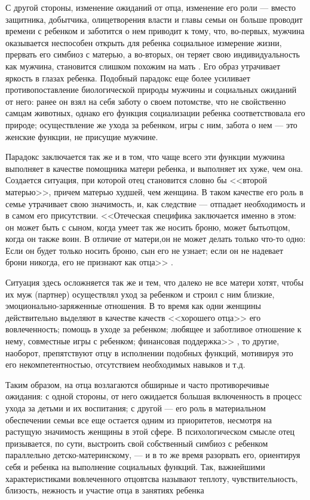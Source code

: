 \documentclass{../../common/thesisbyxetex}
\begin{document}
С другой стороны, изменение ожиданий от отца, изменение его роли --- вместо защитника, добытчика,
олицетворения власти и главы семьи он больше проводит времени с ребенком и заботится о нем
приводит к тому, что, во-первых, мужчина оказывается неспособен открыть для ребенка социальное
измерение жизни, прервать его симбиоз с матерью, а во-вторых, он теряет свою индивидуальность как
мужчина, становится слишком похожим на мать \cite[285]{zo}. Его образ утрачивает
яркость в глазах ребенка. Подобный парадокс еще более усиливает противопоставление биологической
природы мужчины и социальных ожиданий от него: ранее он взял на себя заботу о своем потомстве, что
не свойственно самцам животных, однако его функция социализации ребенка соответствовала его
природе; осуществление же ухода за ребенком, игры  с ним, забота о нем --- это женские функции, не
присущие мужчине.

Парадокс заключается так же и в том, что чаще всего эти функции мужчина выполняет в качестве
помощника матери ребенка, и выполняет их хуже, чем она. Создается ситуация, при
которой отец становится словно бы <<второй матерью>>, причем матерью худшей, чем женщина. В таком
качестве его роль в семье утрачивает свою значимость, и, как следствие --- отпадает
необходимость и в самом его присутствии. <<Отеческая специфика заключается именно в этом: он может
быть с сыном, когда умеет так же носить
броню, может бытьотцом, когда он также воин. В отличие от матери,он не может делать только
что-то одно: Если он будет только носить броню, сын его не узнает; если он не надевает брони
никогда, его не признают как отца>> \cite[287]{zo}.

Ситуация здесь осложняется так же и тем, что далеко не все матери хотят, чтобы их муж (партнер)
осуществлял уход за ребенком и строил с ним близкие, эмоционально-заряженные отношения. В то время
как одни женщины действительно выделяют в качестве качеств <<хорошего отца>>  его вовлеченность;
помощь в уходе за ребенком; любящее и
заботливое отношение к нему, совместные игры с ребенком; финансовая поддержка>> \cite[137]{money},
то другие, наоборот, препятствуют отцу в исполнении подобных функций, мотивируя это его
некомпетентностью, отсутствием необходимых навыков и т.д.


Таким образом, на отца возлагаются обширные и часто противоречивые ожидания: с одной стороны, от
него ожидается большая включенность в процесс ухода за детьми и их воспитания; с другой --- его
роль в материальном обеспечении семьи все еще остается одним из приоритетов, несмотря на растущую
значимость женщины в этой сфере. В психологическом смысле отец призывается, по сути, выстроить свой
собственный симбиоз с ребенком параллельно детско-материнскому, --- и в то же время разорвать его,
ориентируя себя и ребенка на выполнение социальных функций. Так, важнейшими характеристиками
вовлеченного отцовтсва называют теплоту, чувствительность, близость, нежность и участие отца в
занятиях ребенка \cite[129]{f21}
\end{document}
